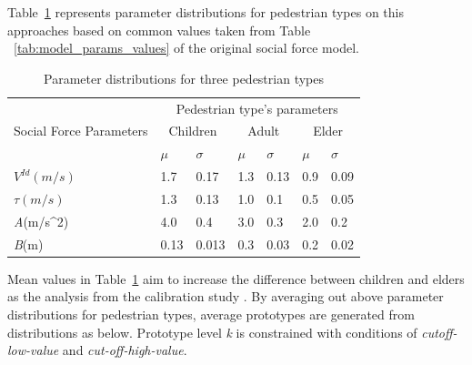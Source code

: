 \documentclass[a4paper,11pt,phdthesis,singlespace,twoside]{cssethesis}
\begin{document}
\begin{itemize}
Table~\ref{tab:model_params_dist} represents parameter distributions for pedestrian types on this approaches based on common values taken from Table ~\ref{tab:model_params_values} of the original social force model.
\begin{table}[H]
\caption{Parameter distributions for three pedestrian types}
\begin{center}
\begin{tabular}{|l|l|l||l|l|l|l|} \hline
\multirow{3}{*}{Social Force Parameters} & \multicolumn{6}{c|}{Pedestrian type's parameters} \\ 
														  \cline{2-7} &
															\multicolumn{2}{c|}{Children} & \multicolumn{2}{c|}{Adult} & \multicolumn{2}{c|}{Elder} \\ 
															\cline{2-7} & \begin{math}\mu\end{math} & \begin{math}\sigma\end{math} &
															\begin{math}\mu\end{math} & \begin{math}\sigma\end{math} &
															\begin{math}\mu\end{math} & \begin{math}\sigma\end{math} \\ \hline
\begin{math}V^{Id}(m/s)\end{math}&1.7&0.17&1.3&0.13&0.9&0.09\\ \hline
\begin{math}\tau(m/s)\end{math}&1.3&0.13&1.0&0.1&0.5&0.05 \\ \hline
\textit{A}(m/s^{2})&4.0&0.4&3.0&0.3&2.0&0.2\\ \hline
\textit{B}(m)&0.13&0.013&0.3&0.03&0.2&0.02\\ \hline	 																										
\end{tabular}
\end{center}
\label{tab:model_params_dist}
\end{table}
Mean values in Table~\ref{tab:model_params_dist}  aim to increase the difference between children and elders as the analysis from the calibration study \cite{Daamen2012}. By averaging out above parameter distributions for pedestrian types, average prototypes are generated from distributions as below. Prototype level \textit{k} is constrained with conditions of \textit{cutoff-low-value} and \textit{cut-off-high-value}.

\end{itemize}
\end{document}
